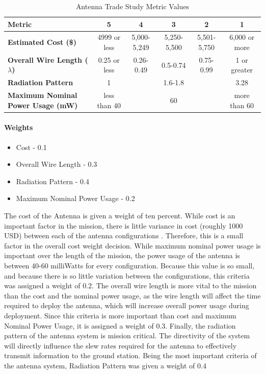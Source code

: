 \begin{table}[H]
\centering
\begin{tabular}{|p{3.5cm}|c|c|c|c|c|}
\hline
    \textbf{Metric} & \textbf{5} & \textbf{4} & \textbf{3} & \textbf{2} & \textbf{1}
    \\
\hline
    \textbf{Estimated Cost (\$)} & 4999 or less & 5,000-5,249 & 5,250-5,500 & 5,501-5,750 & 6,000 or more
    \\
\hline
    \textbf{Overall Wire Length ($\lambda$)} & 0.25 or less & 0.26-0.49  & 0.5-0.74 & 0.75-0.99 & 1 or greater
    \\
\hline
    \textbf{Radiation Pattern} & 1 &  & 1.6-1.8 &  & 3.28
    \\
\hline
    \textbf{Maximum Nominal Power Usage (mW)} & less than 40 &  & 60 &  & more than 60
    \\
\hline
\end{tabular}
\caption{Antenna Trade Study Metric Values}
\label{tbl:Antenna_Metric_Scores}
\end{table}

\paragraph{Weights}
\begin{itemize}
    \item Cost - 0.1
    \item Overall Wire Length - 0.3
    \item Radiation Pattern - 0.4
    \item Maximum Nominal Power Usage - 0.2
\end{itemize}

The cost of the Antenna is given a weight of ten percent. While cost is an important factor in the mission, there is little variance in cost (roughly 1000 USD) between each of the antenna configurations \cite{shop}. Therefore, this is a small factor in the overall cost weight decision. While maximum nominal power usage is important over the length of the mission, the power usage of the antenna is between 40-60 milliWatts for every configuration. Because this value is so small, and because there is so little variation between the configurations, this criteria was assigned a weight of 0.2. The overall wire length is more vital to the mission than the cost and the nominal power usage, as the wire length will affect the time required to deploy the antenna, which will increase overall power usage during deployment. Since this criteria is more important than cost and maximum Nominal Power Usage, it is assigned a weight of 0.3. Finally, the radiation pattern of the antenna system is mission critical. The directivity of the system will directly influence the slew rates required for the antenna to effectively transmit information to the ground station. Being the most important criteria of the antenna system, Radiation Pattern was given a weight of 0.4
